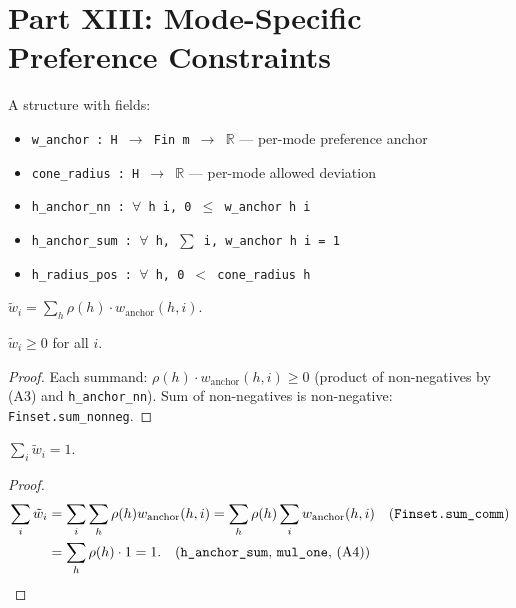 \section{Part XIII: Mode-Specific Preference Constraints}
\label{app:mode_cone}

\begin{definition}
\label{def:mcc}
A structure with fields:
\begin{itemize}
    \item \texttt{w\_anchor : H $\to$ Fin m $\to$ $\mathbb{R}$} --- per-mode preference anchor
    \item \texttt{cone\_radius : H $\to$ $\mathbb{R}$} --- per-mode allowed deviation
    \item \texttt{h\_anchor\_nn : $\forall$ h i, 0 $\le$ w\_anchor h i}
    \item \texttt{h\_anchor\_sum : $\forall$ h, $\sum$ i, w\_anchor h i = 1}
    \item \texttt{h\_radius\_pos : $\forall$ h, 0 $<$ cone\_radius h}
\end{itemize}
\end{definition}

\begin{definition}
$\tilde{w}_i = \sum_h \rho(h) \cdot w_{\mathrm{anchor}}(h,i)$.
\end{definition}

\begin{lemma}
$\tilde{w}_i \ge 0$ for all $i$.
\end{lemma}
\begin{proof}
Each summand: $\rho(h) \cdot w_{\mathrm{anchor}}(h,i) \ge 0$ (product of non-negatives by (A3) and \texttt{h\_anchor\_nn}).  Sum of non-negatives is non-negative: \texttt{Finset.sum\_nonneg}.
\end{proof}

\begin{lemma}
$\sum_i \tilde{w}_i = 1$.
\end{lemma}
\begin{proof}
\begin{align}
    \sum_i \tilde{w}_i &= \sum_i \sum_h \rho(h) w_{\mathrm{anchor}}(h,i) = \sum_h \rho(h) \sum_i w_{\mathrm{anchor}}(h,i) \quad \text{(\texttt{Finset.sum\_comm})} \\
    &= \sum_h \rho(h) \cdot 1 = 1. \quad \text{(\texttt{h\_anchor\_sum}, \texttt{mul\_one}, (A4))}
\end{align}
\end{proof}

